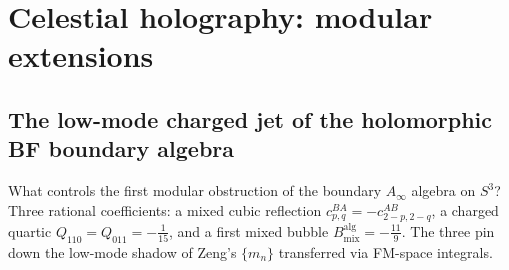 
\providecommand{\A}{\mathcal A}
\providecommand{\B}{\mathcal B}
\providecommand{\C}{\mathbb C}
\providecommand{\D}{\mathcal D}
\providecommand{\E}{\mathcal E}
\providecommand{\F}{\mathcal F}
\providecommand{\G}{\mathfrak G}
\providecommand{\M}{\mathcal M}
\providecommand{\N}{\mathcal N}
\providecommand{\Q}{\mathbb Q}
\providecommand{\R}{\mathbb R}
\providecommand{\Z}{\mathbb Z}
\providecommand{\mc}{\mathfrak m}
\providecommand{\h}{\hbar}
\providecommand{\id}{\mathrm{id}}
\providecommand{\Hom}{\operatorname{Hom}}
\providecommand{\MC}{\operatorname{MC}}
\providecommand{\Cone}{\operatorname{Cone}}
\providecommand{\Obs}{\operatorname{Obs}}
\providecommand{\Sym}{\operatorname{Sym}}
\providecommand{\Tr}{\operatorname{Tr}}
\providecommand{\Span}{\operatorname{Span}}
\providecommand{\End}{\operatorname{End}}
\providecommand{\Ext}{\operatorname{Ext}}
\providecommand{\Defcyc}{\operatorname{Def}_{\mathrm{cyc}}}
\providecommand{\Ran}{\operatorname{Ran}}
\providecommand{\gr}{\operatorname{gr}}
\providecommand{\Hb}{H_b^{0,\bullet}(S^3)}
\providecommand{\HCR}{H_{\mathrm{CR}}^{0,\bullet}(S^3)}
\providecommand{\delbar}{\bar\partial}
\providecommand{\delbarb}{\bar\partial_b}
\providecommand{\ot}{\widehat\otimes}
\providecommand{\ov}[1]{\overline{#1}}
\providecommand{\ModEnv}{\operatorname{ModEnv}}
\providecommand{\Fact}{\operatorname{Fact}}

\section{Celestial holography: modular extensions}
\label{sec:celestial-holography-modular-extensions}

\subsection{The low-mode charged jet of the holomorphic BF boundary algebra}
\label{subsec:low-mode-coefficient-targets}

What controls the first modular obstruction of the boundary $A_\infty$
algebra on $S^3$? Three rational coefficients: a mixed cubic reflection
$c^{BA}_{p,q}=-c^{AB}_{2-p,2-q}$, a charged quartic
$Q_{110}=Q_{011}=-\tfrac{1}{15}$, and a first mixed bubble
$B^{\mathrm{alg}}_{\mathrm{mix}}=-\tfrac{11}{9}$. The three pin down the
low-mode shadow of Zeng's $\{m_n\}$ transferred via FM-space integrals.

